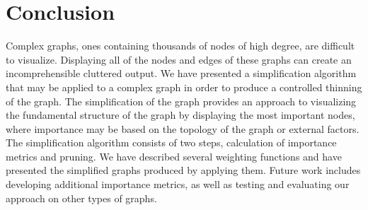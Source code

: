 \section{Conclusion}
Complex graphs, ones containing thousands of nodes of high degree, are difficult to visualize. Displaying all of the nodes and edges of these graphs can create an incomprehensible cluttered output.  We have presented a simplification algorithm that may be applied to a complex graph in order to produce a controlled thinning of the graph. The simplification of the graph provides an approach to visualizing the fundamental structure of the graph by displaying the most important nodes, where importance may be based on the topology of the graph or external factors.  The simplification algorithm consists of two steps, calculation of importance metrics and pruning.  We have described several weighting functions and have presented the simplified graphs produced by applying them.  Future work includes developing additional importance metrics, as well as testing and evaluating our approach on other types of graphs.

